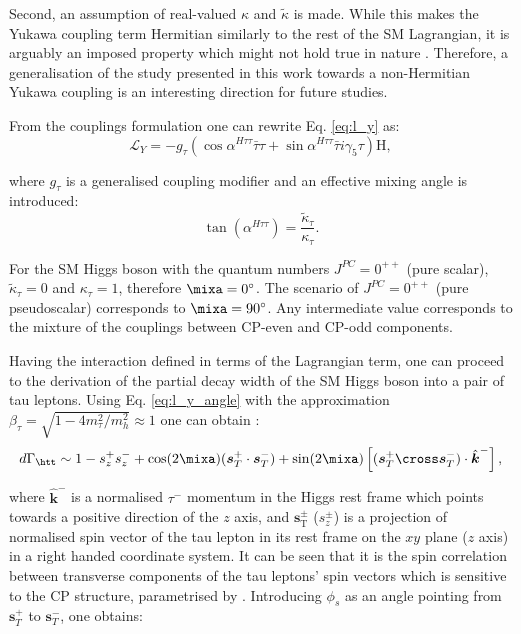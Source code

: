 Second, an assumption of real-valued $\kappa$ and $\tilde{\kappa}$ is made. While this makes the Yukawa coupling term Hermitian similarly to the rest of the SM Lagrangian, it is arguably an imposed property which might not hold true in nature \cite{Mannheim:2021kjs}. Therefore, a generalisation of the study presented in this work towards a non-Hermitian Yukawa coupling \cite{Korchin:2016rsf, Korchin:2021xxl} is an interesting direction for future studies.

From the couplings formulation one can rewrite Eq. \ref{eq:l_y} as:
\begin{equation}\label{eq:l_y_angle}
    \mathcal{L}_Y = -g_\tau(\cos\alpha^{H\tau\tau}\bar{\tau}\tau + \sin\alpha^{H\tau\tau}\bar{\tau}i\gamma_5\tau)\text{H},
\end{equation}

where $g_\tau$ is a generalised coupling modifier and an effective mixing angle is introduced:
\begin{equation}\label{eq:mixa}
    \tan(\alpha^{H\tau\tau}) = \frac{\tilde{\kappa}_\tau}{\kappa_\tau}.
\end{equation}

For the SM Higgs boson with the quantum numbers $J^{PC} = 0^{++}$ (pure scalar), $\tilde{\kappa}_\tau = 0$ and $\kappa_\tau = 1$, therefore $\mixa = 0^\circ$. The scenario of $J^{PC} = 0^{++}$ (pure pseudoscalar) corresponds to $\mixa = 90^\circ$. Any intermediate value corresponds to the mixture of the couplings between CP-even and CP-odd components.

Having the interaction defined in terms of the Lagrangian term, one can proceed to the derivation of the partial decay width of the SM Higgs boson into a pair of tau leptons. Using Eq. \ref{eq:l_y_angle} with the approximation $\beta_\tau = \sqrt{1-4m_\tau^2/m_h^2}\approx1$ one can obtain \cite{Berge:2014wta}:
\begin{equation}
    d\Gamma_{\htt} \sim 1 - s^+_zs^-_z + \cos(2\mixa)(\boldsymbol{s}_T^+\cdot \boldsymbol{s}_T^-) + \sin(2\mixa)\left[(\boldsymbol{s}_T^+\cross \boldsymbol{s}_T^-)\cdot\hat{\boldsymbol{k}}^-\right ],
\end{equation}

where $\hat{\boldsymbol{k}}^-$ is a normalised $\tau^-$ momentum in the Higgs rest frame which points towards a positive direction of the $z$ axis, and $\boldsymbol{s}_\text{T}^\pm$ ($s_z^\pm$) is a projection of normalised spin vector of the tau lepton in its rest frame on the $xy$ plane ($z$ axis) in a right handed coordinate system. It can be seen that it is the spin correlation between transverse components of the tau leptons' spin vectors which is sensitive to the CP structure, parametrised by \mixa. Introducing $\phi_{s}$ as an angle pointing from $\boldsymbol{s}_T^+$ to $\boldsymbol{s}_T^-$, one obtains:


